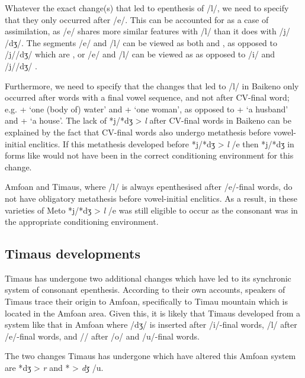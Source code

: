 \documentclass[output=paper]{langscibook}
\begin{document}
Whatever the exact change(s) that led to epenthesis of /l/,
we need to specify that they only occurred after /e/.
This can be accounted for as a case of assimilation, as
/e/ shares more similar features with /l/
than it does with /j/ {\tl} /dʒ/.
The segments /e/ and /l/ can be viewed as both \tsc{[+coronal]} and \tsc{[-high]},
as opposed to /j/{\tl}/dʒ/ which are \tsc{[+high]} \citep[51]{cu18},
or /e/ and /l/ can be viewed as \tsc{[+coronal]}
as opposed to \tsc{[+dorsal]} /i/ and /j/{\tl}/dʒ/ \citep{mo21}.

Furthermore, we need to specify that the changes that led to /l/
in Baikeno only occurred after words with a final vowel sequence,
and not after CV-final word; e.g.  +  {\ra}  `one (body of) water'
and  +  {\ra}  `one woman',
as opposed to  +  {\ra}  `a husband'
and  +  {\ra}  `a house'.
The lack of *j/*{dʒ} > \textit{l} after CV-final words in Baikeno
can be explained by the fact that CV-final words also undergo
metathesis before vowel-initial enclitics.
If this metathesis developed before *j/*{dʒ} > \textit{l} /e{\gap}
then *j/*{dʒ} in forms like  would not have been in the correct
conditioning environment for this change.

Amfo{\Q}an and Timaus, where /l/ is always epenthesised 
after /e/-final words,  do not have obligatory
metathesis before vowel-initial enclitics.
As a result, in these varieties of Meto *j/*{dʒ} > \textit{l} /e{\gap}
was still eligible to occur as the consonant
was in the appropriate conditioning environment.

\subsection{Timaus developments}\label{sec:TimDev}
Timaus has undergone two additional changes
which have led to its synchronic system of  consonant epenthesis.
According to their own accounts, speakers of Timaus
trace their origin to Amfo{\Q}an, specifically to Timau mountain
which is located in the Amfo{\Q}an area.
Given this, it is likely that Timaus developed from
a system like that in Amfo{\Q}an where
/dʒ/ is inserted after /i/-final words, 
/l/ after /e/-final words, and 
/\gw/ after /o/ and /u/-final words.

The two changes Timaus has undergone
which have altered this Amfo{\Q}an system are
*{dʒ} > \textit{r} and *{\gw} > \textit{dʒ} /u.
\end{document}
